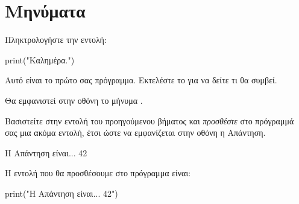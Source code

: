 \documentclass[a4paper,11pt,oneside]{book}
\begin{document}
\worksheettrue
\solutionstrue
{}

\section{Μηνύματα}

\begin{step}
\label{step:print-hello}
Πληκτρολογήστε την εντολή:

\begin{pynew}
print("Καλημέρα.")
\end{pynew}

Αυτό είναι το πρώτο σας πρόγραμμα. Εκτελέστε το για να δείτε τι θα συμβεί.

\begin{answer}
Θα εμφανιστεί στην οθόνη το μήνυμα .
\end{answer}
\end{step}

\begin{step}
\label{step:print-42}
Βασιστείτε στην εντολή του προηγούμενου βήματος και \emph{προσθέστε} στο πρόγραμμά σας μια ακόμα εντολή, έτσι ώστε να εμφανίζεται στην οθόνη η Απάντηση.

\begin{pyterm}
Η Απάντηση είναι... 42
\end{pyterm}

\begin{answer}
Η εντολή που θα προσθέσουμε στο πρόγραμμα είναι:

\begin{pynew}
print("Η Απάντηση είναι... 42")
\end{pynew}
\end{answer}

\end{step}
\end{document}
